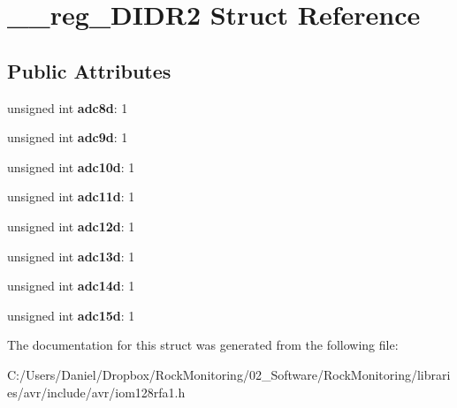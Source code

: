 \hypertarget{struct____reg___d_i_d_r2}{}\section{\+\_\+\+\_\+reg\+\_\+\+D\+I\+D\+R2 Struct Reference}
\label{struct____reg___d_i_d_r2}
\subsection*{Public Attributes}
\begin{DoxyCompactItemize}
\item 
unsigned int {\bfseries adc8d}\+: 1\hypertarget{struct____reg___d_i_d_r2_a09934183586a08b2434d6f181426b146}{}\label{struct____reg___d_i_d_r2_a09934183586a08b2434d6f181426b146}

\item 
unsigned int {\bfseries adc9d}\+: 1\hypertarget{struct____reg___d_i_d_r2_a937127e81e8a43943d7b83dfd68322fd}{}\label{struct____reg___d_i_d_r2_a937127e81e8a43943d7b83dfd68322fd}

\item 
unsigned int {\bfseries adc10d}\+: 1\hypertarget{struct____reg___d_i_d_r2_a1f8d0f0f919a5500345ee4d421910282}{}\label{struct____reg___d_i_d_r2_a1f8d0f0f919a5500345ee4d421910282}

\item 
unsigned int {\bfseries adc11d}\+: 1\hypertarget{struct____reg___d_i_d_r2_a5cbca2b4e746d87ce3326b2393f46772}{}\label{struct____reg___d_i_d_r2_a5cbca2b4e746d87ce3326b2393f46772}

\item 
unsigned int {\bfseries adc12d}\+: 1\hypertarget{struct____reg___d_i_d_r2_adc820202be0aa744af2f74ac1b2db5e6}{}\label{struct____reg___d_i_d_r2_adc820202be0aa744af2f74ac1b2db5e6}

\item 
unsigned int {\bfseries adc13d}\+: 1\hypertarget{struct____reg___d_i_d_r2_a15d503942e8e58d2b3274b35f6d69010}{}\label{struct____reg___d_i_d_r2_a15d503942e8e58d2b3274b35f6d69010}

\item 
unsigned int {\bfseries adc14d}\+: 1\hypertarget{struct____reg___d_i_d_r2_ae3f9f10b2d0e6a53886d5bba4e8ceaad}{}\label{struct____reg___d_i_d_r2_ae3f9f10b2d0e6a53886d5bba4e8ceaad}

\item 
unsigned int {\bfseries adc15d}\+: 1\hypertarget{struct____reg___d_i_d_r2_a90d62c60e5efa16d9ec98f38e2ca09ee}{}\label{struct____reg___d_i_d_r2_a90d62c60e5efa16d9ec98f38e2ca09ee}

\end{DoxyCompactItemize}


The documentation for this struct was generated from the following file\+:\begin{DoxyCompactItemize}
\item 
C\+:/\+Users/\+Daniel/\+Dropbox/\+Rock\+Monitoring/02\+\_\+\+Software/\+Rock\+Monitoring/libraries/avr/include/avr/iom128rfa1.\+h\end{DoxyCompactItemize}
